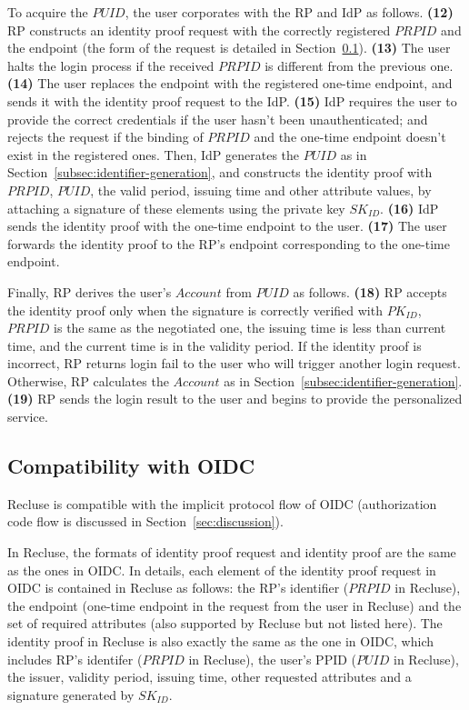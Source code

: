 To acquire the $PUID$, the user corporates with the RP and IdP as follows. \textbf{(12)} RP constructs an identity proof request with the correctly registered $PRPID$ and the endpoint (the form of the request is detailed in Section~\ref{subsec:compatible}). \textbf{(13)} The user halts the login process if the received $PRPID$ is different from the previous one. \textbf{(14)} The user replaces the endpoint with the registered one-time endpoint, and sends it with the identity proof request to the IdP. \textbf{(15)} IdP requires the user to provide the correct credentials if the user hasn't been unauthenticated; and rejects the request if the binding of $PRPID$ and the one-time endpoint doesn't exist in the registered ones. Then, IdP generates the $PUID$ as in Section~\ref{subsec:identifier-generation}, and constructs the identity proof with $PRPID$, $PUID$, the valid period, issuing time and other attribute values, by attaching a signature of these elements using the private key $SK_{ID}$. \textbf{(16)} IdP sends the identity proof with the one-time endpoint to the user. \textbf{(17)} The user forwards the identity proof to the RP's endpoint corresponding to the one-time endpoint.

Finally, RP derives the user's  $Account$ from $PUID$ as follows. \textbf{(18)} RP accepts the identity proof only when the signature is correctly verified with $PK_{ID}$, $PRPID$ is the same as the negotiated one, the issuing time is less than current time, and the current time is in the validity period. If the identity proof is incorrect, RP returns login fail to the user who will trigger another login request. Otherwise, RP calculates the $Account$ as in Section~\ref{subsec:identifier-generation}. \textbf{(19)} RP sends the login result to the user and begins to provide the personalized service.


\subsection{Compatibility with OIDC}
\label{subsec:compatible}
Recluse is compatible with the implicit protocol flow of OIDC (authorization code flow is discussed in Section~\ref{sec:discussion}).

In Recluse, the formats of identity proof request and identity proof are the same as the ones in OIDC. In details, each element of the identity proof request in OIDC is contained in Recluse as follows: the RP's identifier ($PRPID$ in Recluse), the endpoint (one-time endpoint in the request from the user in Recluse) and the set of required attributes (also supported by Recluse but not listed here). The identity proof in Recluse is also exactly the same as the one in OIDC, which includes RP's identifer ($PRPID$ in Recluse), the user's PPID ($PUID$ in Recluse), the issuer, validity period, issuing time, other requested attributes and a signature generated by $SK_{ID}$. %

